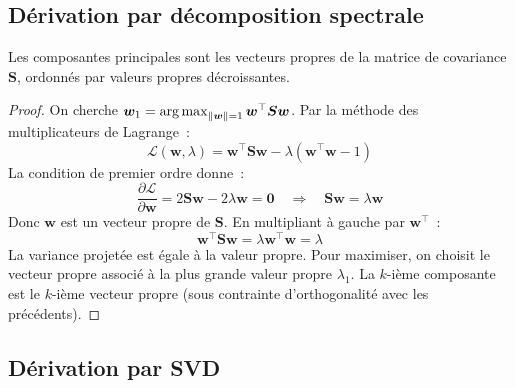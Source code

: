 \subsection{D\'erivation par d\'ecomposition spectrale}

\begin{theoreme}
Les composantes principales sont les vecteurs propres de la matrice de
covariance $\bm{S}$, ordonn\'es par valeurs propres d\'ecroissantes.
\end{theoreme}

\begin{proof}
On cherche $\bm{w}_1 = \operatorname*{arg\,max}_{\left\| \bm{w} \right\|=1} \bm{w}^\top \bm{S} \bm{w}$.
Par la m\'ethode des multiplicateurs de Lagrange~:
\begin{equation}
  \mathcal{L}(\bm{w}, \lambda) = \bm{w}^\top \bm{S} \bm{w} -
  \lambda(\bm{w}^\top \bm{w} - 1)
\end{equation}
La condition de premier ordre donne~:
\begin{equation}
  \frac{\partial \mathcal{L}}{\partial \bm{w}} = 2\bm{S}\bm{w} -
  2\lambda\bm{w} = \bm{0} \quad \Longrightarrow \quad
  \bm{S}\bm{w} = \lambda\bm{w}
  \label{eq:pca-eigen}
\end{equation}
Donc $\bm{w}$ est un vecteur propre de $\bm{S}$. En multipliant \`a gauche
par $\bm{w}^\top$~:
\begin{equation}
  \bm{w}^\top \bm{S} \bm{w} = \lambda \bm{w}^\top \bm{w} = \lambda
\end{equation}
La variance projet\'ee est \'egale \`a la valeur propre. Pour maximiser,
on choisit le vecteur propre associ\'e \`a la plus grande valeur propre
$\lambda_1$. La $k$-i\`eme composante est le $k$-i\`eme vecteur propre
(sous contrainte d'orthogonalit\'e avec les pr\'ec\'edents).
\end{proof}

\subsection{D\'erivation par SVD}

